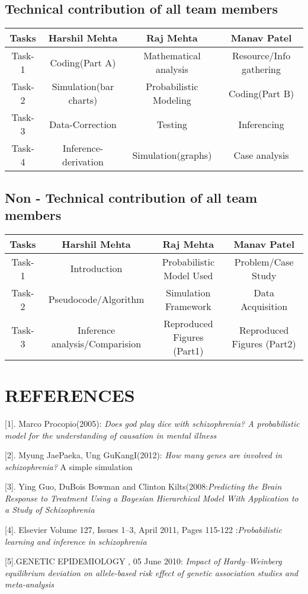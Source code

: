\documentclass{article}
\begin{document}
\subsection{Technical contribution of all team members} 
\begin{center}
 \begin{tabular}{||c|c|c|c||} 
 \hline
 Tasks & Harshil Mehta & Raj Mehta & Manav Patel \\ [0.5ex] 
 \hline\hline
 Task-1 & Coding(Part A) & Mathematical analysis & Resource/Info gathering \\ 
 \hline
 Task-2 & Simulation(bar charts) & Probabilistic Modeling & Coding(Part B) \\
 \hline
 Task-3 & Data-Correction & Testing & Inferencing \\
 \hline
 Task-4 & Inference-derivation & Simulation(graphs) & Case analysis \\ [1ex]
 \hline
\end{tabular}
\end{center}
\subsection{Non - Technical contribution of all team members} 
\begin{center}
 \begin{tabular}{||c|c|c|c||} 
 \hline
 Tasks & Harshil Mehta & Raj Mehta & Manav Patel \\ [0.5ex] 
 \hline\hline
 Task-1 & Introduction & Probabilistic Model Used & Problem/Case Study \\ 
 \hline
 Task-2 & Pseudocode/Algorithm & Simulation Framework & Data Acquisition \\
 \hline
 Task-3 & Inference analysis/Comparision & Reproduced Figures (Part1) & Reproduced Figures (Part2)\\ [1ex]
 \hline
\end{tabular}
\end{center}

\newpage 
\section{REFERENCES}

[1]. Marco Procopio(2005): \emph{Does god play dice with schizophrenia? A probabilistic model for the understanding of causation in mental illness}

[2]. Myung JaePaeka, Ung GuKangI(2012): \emph{How many genes are involved in schizophrenia?} A simple simulation

[3]. Ying Guo, DuBois Bowman and Clinton Kilts(2008:\emph{Predicting the Brain Response to Treatment Using a Bayesian Hierarchical Model With Application to a Study of Schizophrenia}

[4]. Elsevier Volume 127, Issues 1–3, April 2011, Pages 115-122 :\emph{Probabilistic learning and inference in schizophrenia}

[5].GENETIC EPIDEMIOLOGY , 05 June 2010: \emph{Impact of Hardy–Weinberg equilibrium deviation on allele-based risk effect of genetic association studies and meta-analysis}
\end{document}
